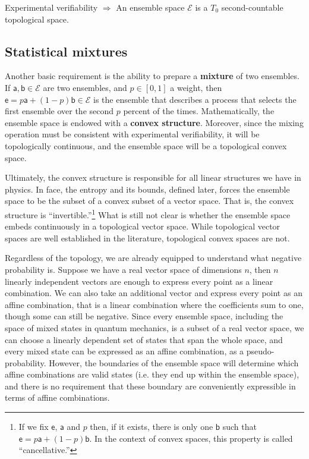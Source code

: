 \documentclass[10pt,twocolumn, nofootinbib]{revtex4-2}
\newcommand{\ens}[1][e] {\mathsf{#1}} %
\newcommand{\Ens}[1][E] {\mathcal{#1}} %
\begin{document}
\begin{tcolorbox}[colback=white, colframe=black]
	Experimental verifiability $\Rightarrow$ An ensemble space $\Ens$ is a $T_0$ second-countable topological space.
\end{tcolorbox}


\subsection{Statistical mixtures}
Another basic requirement is the ability to prepare a \textbf{mixture} of two ensembles. If $\ens[a], \ens[b] \in \Ens$ are two ensembles, and $p \in [0,1]$ a weight, then $\ens = p \ens[a] + (1-p) \ens[b] \in \Ens$ is the ensemble that describes a process that selects the first ensemble over the second $p$ percent of the times. Mathematically, the ensemble space is endowed with a \textbf{convex structure}. Moreover, since the mixing operation must be consistent with experimental verifiability, it will be topologically continuous, and the ensemble space will be a topological convex space.

Ultimately, the convex structure is responsible for all linear structures we have in physics. In face, the entropy and its bounds, defined later, forces the ensemble space to be the subset of a convex subset of a vector space. That is, the convex structure is ``invertible.''\footnote{If we fix $\ens$, $\ens[a]$ and $p$ then, if it exists, there is only one $\ens[b]$ such that $\ens = p \ens[a] + (1-p) \ens[b]$. In the context of convex spaces, this property is called ``cancellative.''} What is still not clear is whether the ensemble space embeds continuously in a topological vector space. While topological vector spaces are well established in the literature, topological convex spaces are not. 

Regardless of the topology, we are already equipped to understand what negative probability is. Suppose we have a real vector space of dimensions $n$, then $n$ linearly independent vectors are enough to express every point as a linear combination. We can also take an additional vector and express every point as an affine combination, that is a linear combination where the coefficients sum to one, though some can still be negative. Since every ensemble space, including the space of mixed states in quantum mechanics, is a subset of a real vector space, we can choose a linearly dependent set of states that span the whole space, and every mixed state can be expressed as an affine combination, as a pseudo-probability. However, the boundaries of the ensemble space will determine which affine combinations are valid states (i.e. they end up within the ensemble space), and there is no requirement that these boundary are conveniently expressible in terms of affine combinations.
\end{document}
